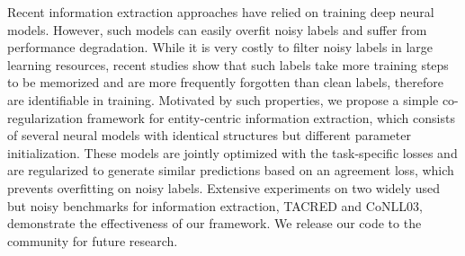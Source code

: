 Recent information extraction approaches have relied on training deep neural models. However, such models can easily overfit noisy labels and suffer from performance degradation. While it is very costly to filter noisy labels in large learning resources, recent studies show that such labels take more training steps to be memorized and are more frequently forgotten than clean labels, therefore are identifiable in training. Motivated by such properties, we propose a simple co-regularization framework for entity-centric information extraction, which consists of several neural models with identical structures but different parameter initialization. These models are jointly optimized with the task-specific losses and are regularized to generate similar predictions based on an agreement loss, which prevents overfitting on noisy labels. Extensive experiments on two widely used but noisy benchmarks for information extraction, TACRED and CoNLL03, demonstrate the effectiveness of our framework. We release our code to the community for future research.
